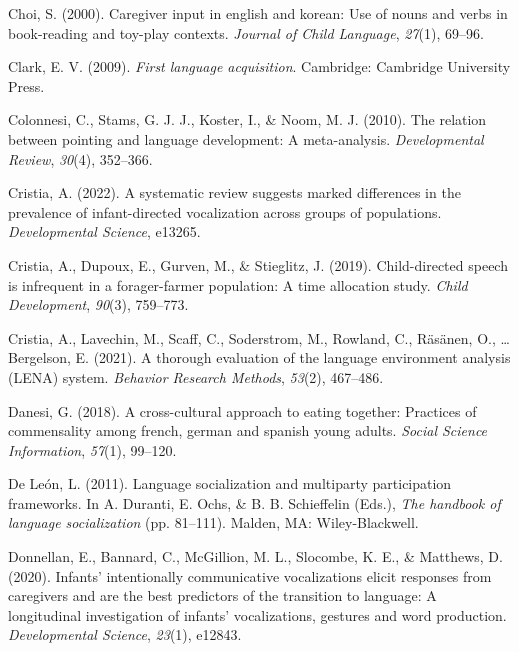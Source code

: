 \documentclass[
  man,floatsintext]{apa6}
\newlength{\cslhangindent}
\newlength{\cslentryspacingunit} %
\newenvironment{CSLReferences}[2] %
 {%
  \setlength{\parindent}{0pt}
  \ifodd #1
  \let\oldpar\par
  \def\par{\hangindent=\cslhangindent\oldpar}
  \fi
  \setlength{\parskip}{#2\cslentryspacingunit}
 }%
 {}
\begin{document}
\begin{CSLReferences}{1}{0}
\leavevmode{}%
Choi, S. (2000). Caregiver input in english and korean: Use of nouns and verbs in book-reading and toy-play contexts. \emph{Journal of Child Language}, \emph{27}(1), 69--96.

\leavevmode{}%
Clark, E. V. (2009). \emph{First language acquisition}. Cambridge: Cambridge University Press.

\leavevmode{}%
Colonnesi, C., Stams, G. J. J., Koster, I., \& Noom, M. J. (2010). The relation between pointing and language development: A meta-analysis. \emph{Developmental Review}, \emph{30}(4), 352--366.

\leavevmode{}%
Cristia, A. (2022). A systematic review suggests marked differences in the prevalence of infant-directed vocalization across groups of populations. \emph{Developmental Science}, e13265.

\leavevmode{}%
Cristia, A., Dupoux, E., Gurven, M., \& Stieglitz, J. (2019). Child-directed speech is infrequent in a forager-farmer population: A time allocation study. \emph{Child Development}, \emph{90}(3), 759--773.

\leavevmode{}%
Cristia, A., Lavechin, M., Scaff, C., Soderstrom, M., Rowland, C., Räsänen, O., \ldots{} Bergelson, E. (2021). A thorough evaluation of the language environment analysis (LENA) system. \emph{Behavior Research Methods}, \emph{53}(2), 467--486.

\leavevmode{}%
Danesi, G. (2018). A cross-cultural approach to eating together: Practices of commensality among french, german and spanish young adults. \emph{Social Science Information}, \emph{57}(1), 99--120.

\leavevmode{}%
De León, L. (2011). Language socialization and multiparty participation frameworks. In A. Duranti, E. Ochs, \& B. B. Schieffelin (Eds.), \emph{The handbook of language socialization} (pp. 81--111). Malden, MA: Wiley-Blackwell.

\leavevmode{}%
Donnellan, E., Bannard, C., McGillion, M. L., Slocombe, K. E., \& Matthews, D. (2020). Infants' intentionally communicative vocalizations elicit responses from caregivers and are the best predictors of the transition to language: A longitudinal investigation of infants' vocalizations, gestures and word production. \emph{Developmental Science}, \emph{23}(1), e12843.


\end{CSLReferences}
\end{document}
